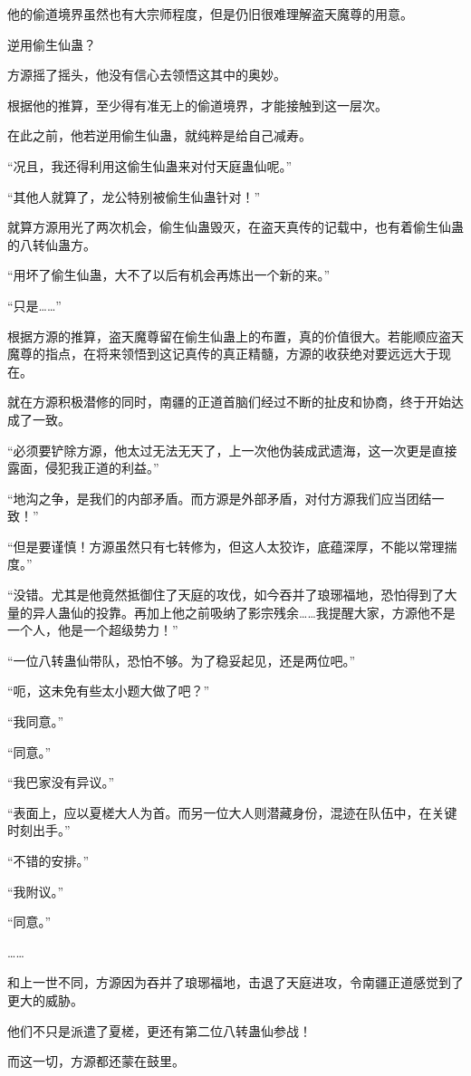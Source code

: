 \begin{this_body}
他的偷道境界虽然也有大宗师程度，但是仍旧很难理解盗天魔尊的用意。

逆用偷生仙蛊？

方源摇了摇头，他没有信心去领悟这其中的奥妙。

根据他的推算，至少得有准无上的偷道境界，才能接触到这一层次。

在此之前，他若逆用偷生仙蛊，就纯粹是给自己减寿。

“况且，我还得利用这偷生仙蛊来对付天庭蛊仙呢。”

“其他人就算了，龙公特别被偷生仙蛊针对！”

就算方源用光了两次机会，偷生仙蛊毁灭，在盗天真传的记载中，也有着偷生仙蛊的八转仙蛊方。

“用坏了偷生仙蛊，大不了以后有机会再炼出一个新的来。”

“只是……”

根据方源的推算，盗天魔尊留在偷生仙蛊上的布置，真的价值很大。若能顺应盗天魔尊的指点，在将来领悟到这记真传的真正精髓，方源的收获绝对要远远大于现在。

就在方源积极潜修的同时，南疆的正道首脑们经过不断的扯皮和协商，终于开始达成了一致。

“必须要铲除方源，他太过无法无天了，上一次他伪装成武遗海，这一次更是直接露面，侵犯我正道的利益。”

“地沟之争，是我们的内部矛盾。而方源是外部矛盾，对付方源我们应当团结一致！”

“但是要谨慎！方源虽然只有七转修为，但这人太狡诈，底蕴深厚，不能以常理揣度。”

“没错。尤其是他竟然抵御住了天庭的攻伐，如今吞并了琅琊福地，恐怕得到了大量的异人蛊仙的投靠。再加上他之前吸纳了影宗残余……我提醒大家，方源他不是一个人，他是一个超级势力！”

“一位八转蛊仙带队，恐怕不够。为了稳妥起见，还是两位吧。”

“呃，这未免有些太小题大做了吧？”

“我同意。”

“同意。”

“我巴家没有异议。”

“表面上，应以夏槎大人为首。而另一位大人则潜藏身份，混迹在队伍中，在关键时刻出手。”

“不错的安排。”

“我附议。”

“同意。”

……

和上一世不同，方源因为吞并了琅琊福地，击退了天庭进攻，令南疆正道感觉到了更大的威胁。

他们不只是派遣了夏槎，更还有第二位八转蛊仙参战！

而这一切，方源都还蒙在鼓里。

\end{this_body}

